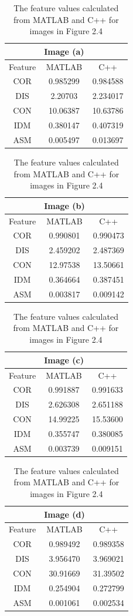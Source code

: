 \begin{table}[!b]
\begin{center}
\begin{tabular}{||c c c ||}
& Image (a) & \\
\hline
Feature & MATLAB & C++ \\[0.7ex]
\hline\hline
COR & 0.985299 & 0.984588 \\
DIS & 2.20703 & 2.234017 \\
CON & 10.06387 & 10.63786 \\
IDM & 0.380147 & 0.407319 \\
ASM & 0.005497 & 0.013697 \\
\hline
\end{tabular}
\vspace{0.5cm}
\begin{tabular}{||c c c ||}
& Image (b) & \\
\hline
Feature & MATLAB & C++ \\[0.7ex]
\hline\hline
COR & 0.990801 & 0.990473 \\
DIS & 2.459202 & 2.487369 \\
CON & 12.97538 & 13.50661 \\
IDM & 0.364664 & 0.387451 \\
ASM & 0.003817 & 0.009142 \\
\hline
\end{tabular}
\begin{tabular}{||c c c ||}
& Image (c) & \\
\hline
Feature & MATLAB & C++ \\[0.7ex]
\hline\hline
COR & 0.991887 & 0.991633 \\
DIS & 2.626308 & 2.651188 \\
CON & 14.99225 & 15.53600 \\
IDM & 0.355747 & 0.380085 \\
ASM & 0.003739 & 0.009151 \\
\hline
\end{tabular}
\begin{tabular}{||c c c ||}
& Image (d) & \\
\hline
Feature & MATLAB & C++ \\[0.7ex]
\hline\hline
COR & 0.989492 & 0.989358 \\
DIS & 3.956470 & 3.969021 \\
CON & 30.91669 & 31.39502 \\
IDM & 0.254904 & 0.272799 \\
ASM & 0.001061 & 0.002534 \\
\hline
\end{tabular}
\caption {The feature values calculated from MATLAB and C++ for images in Figure 2.4}
\end{center}
\end{table}
